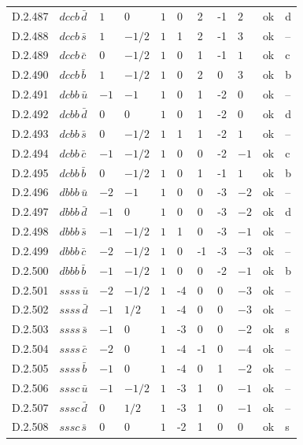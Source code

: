{\begin{longtable}{@{}llllllllll>{\raggedright\arraybackslash}p{2.0cm}@{}}
D.2.487 & $dccb\,\bar{d}$ & $1$ & $0$ & $1$ & 0 & 2 & -1 & $2$ & ok & d \\
D.2.488 & $dccb\,\bar{s}$ & $1$ & $-1/2$ & $1$ & 1 & 2 & -1 & $3$ & ok & -- \\
D.2.489 & $dccb\,\bar{c}$ & $0$ & $-1/2$ & $1$ & 0 & 1 & -1 & $1$ & ok & c \\
D.2.490 & $dccb\,\bar{b}$ & $1$ & $-1/2$ & $1$ & 0 & 2 & 0 & $3$ & ok & b \\
D.2.491 & $dcbb\,\bar{u}$ & $-1$ & $-1$ & $1$ & 0 & 1 & -2 & $0$ & ok & -- \\
D.2.492 & $dcbb\,\bar{d}$ & $0$ & $0$ & $1$ & 0 & 1 & -2 & $0$ & ok & d \\
D.2.493 & $dcbb\,\bar{s}$ & $0$ & $-1/2$ & $1$ & 1 & 1 & -2 & $1$ & ok & -- \\
D.2.494 & $dcbb\,\bar{c}$ & $-1$ & $-1/2$ & $1$ & 0 & 0 & -2 & $-1$ & ok & c \\
D.2.495 & $dcbb\,\bar{b}$ & $0$ & $-1/2$ & $1$ & 0 & 1 & -1 & $1$ & ok & b \\
D.2.496 & $dbbb\,\bar{u}$ & $-2$ & $-1$ & $1$ & 0 & 0 & -3 & $-2$ & ok & -- \\
D.2.497 & $dbbb\,\bar{d}$ & $-1$ & $0$ & $1$ & 0 & 0 & -3 & $-2$ & ok & d \\
D.2.498 & $dbbb\,\bar{s}$ & $-1$ & $-1/2$ & $1$ & 1 & 0 & -3 & $-1$ & ok & -- \\
D.2.499 & $dbbb\,\bar{c}$ & $-2$ & $-1/2$ & $1$ & 0 & -1 & -3 & $-3$ & ok & -- \\
D.2.500 & $dbbb\,\bar{b}$ & $-1$ & $-1/2$ & $1$ & 0 & 0 & -2 & $-1$ & ok & b \\
D.2.501 & $ssss\,\bar{u}$ & $-2$ & $-1/2$ & $1$ & -4 & 0 & 0 & $-3$ & ok & -- \\
D.2.502 & $ssss\,\bar{d}$ & $-1$ & $1/2$ & $1$ & -4 & 0 & 0 & $-3$ & ok & -- \\
D.2.503 & $ssss\,\bar{s}$ & $-1$ & $0$ & $1$ & -3 & 0 & 0 & $-2$ & ok & s \\
D.2.504 & $ssss\,\bar{c}$ & $-2$ & $0$ & $1$ & -4 & -1 & 0 & $-4$ & ok & -- \\
D.2.505 & $ssss\,\bar{b}$ & $-1$ & $0$ & $1$ & -4 & 0 & 1 & $-2$ & ok & -- \\
D.2.506 & $sssc\,\bar{u}$ & $-1$ & $-1/2$ & $1$ & -3 & 1 & 0 & $-1$ & ok & -- \\
D.2.507 & $sssc\,\bar{d}$ & $0$ & $1/2$ & $1$ & -3 & 1 & 0 & $-1$ & ok & -- \\
D.2.508 & $sssc\,\bar{s}$ & $0$ & $0$ & $1$ & -2 & 1 & 0 & $0$ & ok & s \\

\end{longtable}}
